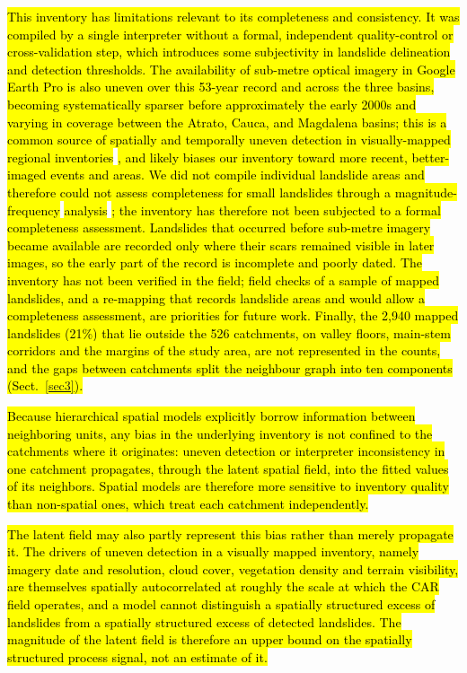 \documentclass[journal abbreviation, manuscript]{copernicus}
\newcommand{\hlE}[1]{{\sethlcolor{edcyan}\hl{#1}}}
\begin{document}
\hl{This inventory has limitations relevant to its completeness and consistency. 
It was compiled by a single interpreter without a formal, independent quality-control or cross-validation step, which introduces some subjectivity in landslide delineation and detection thresholds. 
The availability of sub-metre optical imagery in Google Earth Pro is also uneven over this 53-year record and across the three basins, becoming systematically sparser before approximately the early 2000s and varying in coverage between the Atrato, Cauca, and Magdalena basins; this is a common source of spatially and temporally uneven detection in visually-mapped regional inventories }\citep{loche2022landslide}\hl{, and likely biases our inventory toward more recent, better-imaged events and areas. 
We did not compile individual landslide areas and therefore could not assess completeness for small landslides through a magnitude-frequency} \hlE{analysis} \citep{malamud2004landslide, tanyas2020completeness}\hlE{; the inventory has therefore not been subjected to a formal completeness assessment. Landslides that occurred before sub-metre imagery became available are recorded only where their scars remained visible in later images, so the early part of the record is incomplete and poorly dated. The inventory has not been verified in the field; field checks of a sample of mapped landslides, and a re-mapping that records landslide areas and would allow a completeness assessment, are priorities for future work. Finally, the 2,940 mapped landslides (21\%) that lie outside the 526 catchments, on valley floors, main-stem corridors and the margins of the study area, are not represented in the counts, and the gaps between catchments split the neighbour graph into ten components (\mbox{Sect.~\ref{sec3}}).}

\hl{Because hierarchical spatial models explicitly borrow information between neighboring units, any bias in the underlying inventory is not confined to the catchments where it originates: uneven detection or interpreter inconsistency in one catchment propagates, through the latent spatial field, into the fitted values of its neighbors. 
Spatial models are therefore more sensitive to inventory quality than non-spatial ones, which treat each catchment independently.}

\hlE{The latent field may also partly represent this bias rather than merely propagate it. The drivers of uneven detection in a visually mapped inventory, namely imagery date and resolution, cloud cover, vegetation density and terrain visibility, are themselves spatially autocorrelated at roughly the scale at which the CAR field operates, and a model cannot distinguish a spatially structured excess of landslides from a spatially structured excess of detected landslides. The magnitude of the latent field is therefore an upper bound on the spatially structured process signal, not an estimate of it.}
\end{document}
